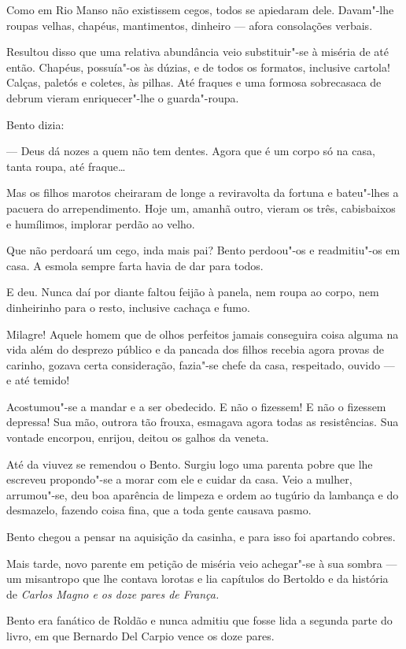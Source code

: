 Como em Rio Manso não existissem cegos, todos se apiedaram dele.
Davam"-lhe roupas velhas, chapéus, mantimentos, dinheiro --- afora
consolações verbais.

Resultou disso que uma relativa abundância veio substituir"-se à miséria
de até então. Chapéus, possuía"-os às dúzias, e de todos os formatos,
inclusive cartola! Calças, paletós e coletes, às pilhas. Até fraques e
uma formosa sobrecasaca de debrum vieram enriquecer"-lhe o guarda"-roupa.

Bento dizia:

--- Deus dá nozes a quem não tem dentes. Agora que é um corpo só na
casa, tanta roupa, até fraque\ldots{}

Mas os filhos marotos cheiraram de longe a reviravolta da fortuna e
bateu"-lhes a pacuera do arrependimento. Hoje um, amanhã outro, vieram os
três, cabisbaixos e humílimos, implorar perdão ao velho.

Que não perdoará um cego, inda mais pai? Bento perdoou"-os e readmitiu"-os
em casa. A esmola sempre farta havia de dar para todos.

E deu. Nunca daí por diante faltou feijão à panela, nem roupa ao corpo,
nem dinheirinho para o resto, inclusive cachaça e fumo.

Milagre! Aquele homem que de olhos perfeitos jamais conseguira coisa
alguma na vida além do desprezo público e da pancada dos filhos recebia
agora provas de carinho, gozava certa consideração, fazia"-se chefe da
casa, respeitado, ouvido --- e até temido!

Acostumou"-se a mandar e a ser obedecido. E não o fizessem! E não o
fizessem depressa! Sua mão, outrora tão frouxa, esmagava agora todas as
resistências. Sua vontade encorpou, enrijou, deitou os galhos da veneta.

Até da viuvez se remendou o Bento. Surgiu logo uma parenta pobre que lhe
escreveu propondo"-se a morar com ele e cuidar da casa. Veio a mulher,
arrumou"-se, deu boa aparência de limpeza e ordem ao tugúrio da lambança
e do desmazelo, fazendo coisa fina, que a toda gente causava pasmo.

Bento chegou a pensar na aquisição da casinha, e para isso foi apartando
cobres.

Mais tarde, novo parente em petição de miséria veio achegar"-se à sua
sombra --- um misantropo que lhe contava lorotas e lia capítulos do
Bertoldo e da história de \emph{Carlos Magno e os doze pares de França.}

Bento era fanático de Roldão e nunca admitiu que fosse lida a segunda
parte do livro, em que Bernardo Del Carpio vence os doze pares.

